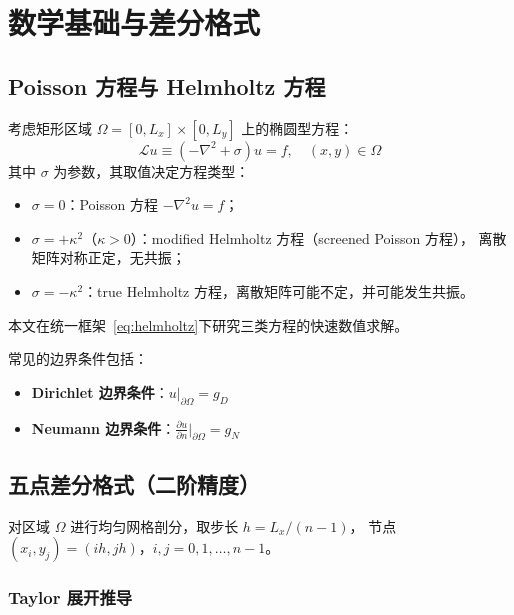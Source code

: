 \section{数学基础与差分格式}
\label{sec:math}

\subsection{Poisson 方程与 Helmholtz 方程}

考虑矩形区域 $\Omega = [0, L_x] \times [0, L_y]$ 上的椭圆型方程：
\begin{equation}
  \mathcal{L}u \equiv (-\nabla^2 + \sigma)u = f, \quad (x,y) \in \Omega
  \label{eq:helmholtz}
\end{equation}
其中 $\sigma$ 为参数，其取值决定方程类型：
\begin{itemize}[itemsep=2pt]
  \item $\sigma = 0$：Poisson 方程 $-\nabla^2 u = f$；
  \item $\sigma = +\kappa^2$（$\kappa > 0$）：modified Helmholtz 方程（screened Poisson 方程），
        离散矩阵对称正定，无共振；
  \item $\sigma = -\kappa^2$：true Helmholtz 方程，离散矩阵可能不定，并可能发生共振。
\end{itemize}
本文在统一框架~\eqref{eq:helmholtz}下研究三类方程的快速数值求解。

常见的边界条件包括：
\begin{itemize}[itemsep=2pt]
  \item \textbf{Dirichlet 边界条件}：$u|_{\partial\Omega} = g_D$
  \item \textbf{Neumann 边界条件}：$\frac{\partial u}{\partial n}\big|_{\partial\Omega} = g_N$
\end{itemize}

\subsection{五点差分格式（二阶精度）}

对区域 $\Omega$ 进行均匀网格剖分，取步长 $h = L_x / (n-1)$，
节点 $(x_i, y_j) = (ih, jh)$，$i,j = 0, 1, \ldots, n-1$。

\subsubsection{Taylor 展开推导}


